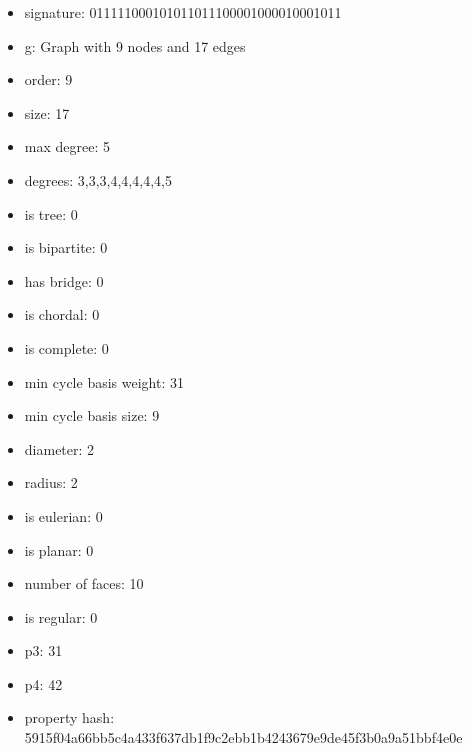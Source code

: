 \newpage
\begin{figure}
\end{figure}
\begin{itemize}
\item signature: 011111000101011011100001000010001011
\item g: Graph with 9 nodes and 17 edges
\item order: 9
\item size: 17
\item max degree: 5
\item degrees: 3,3,3,4,4,4,4,4,5
\item is tree: 0
\item is bipartite: 0
\item has bridge: 0
\item is chordal: 0
\item is complete: 0
\item min cycle basis weight: 31
\item min cycle basis size: 9
\item diameter: 2
\item radius: 2
\item is eulerian: 0
\item is planar: 0
\item number of faces: 10
\item is regular: 0
\item p3: 31
\item p4: 42
\item property hash: 5915f04a66bb5c4a433f637db1f9c2ebb1b4243679e9de45f3b0a9a51bbf4e0e
\end{itemize}
